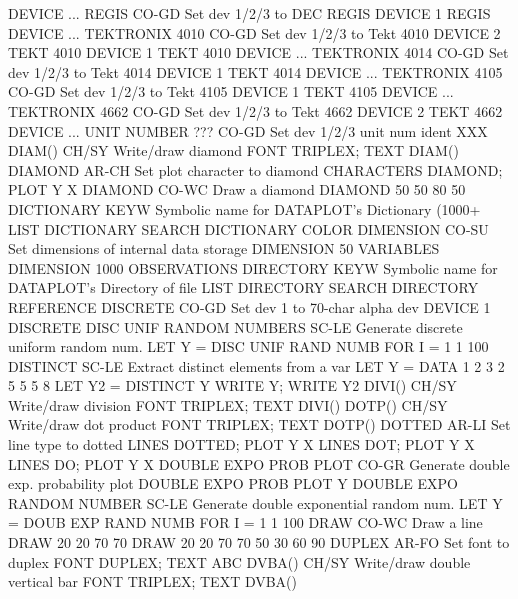 DEVICE ... REGIS            CO-GD Set dev 1/2/3 to DEC REGIS
                                  DEVICE 1 REGIS
DEVICE ... TEKTRONIX 4010   CO-GD Set dev 1/2/3 to Tekt 4010
                                  DEVICE 2 TEKT 4010
                                  DEVICE 1 TEKT 4010
DEVICE ... TEKTRONIX 4014   CO-GD Set dev 1/2/3 to Tekt 4014
                                  DEVICE 1 TEKT 4014
DEVICE ... TEKTRONIX 4105   CO-GD Set dev 1/2/3 to Tekt 4105
                                  DEVICE 1 TEKT 4105
DEVICE ... TEKTRONIX 4662   CO-GD Set dev 1/2/3 to Tekt 4662
                                  DEVICE 2 TEKT 4662
DEVICE ... UNIT NUMBER ???  CO-GD Set dev 1/2/3 unit num ident
                                  XXX
DIAM()                      CH/SY Write/draw diamond
                                  FONT TRIPLEX; TEXT DIAM()
DIAMOND                     AR-CH Set plot character to diamond
                                  CHARACTERS DIAMOND; PLOT Y X
DIAMOND                     CO-WC Draw a diamond
                                  DIAMOND 50 50 80 50
DICTIONARY                  KEYW  Symbolic name for DATAPLOT's Dictionary (1000+
                                  LIST DICTIONARY
                                  SEARCH DICTIONARY COLOR
DIMENSION                   CO-SU Set dimensions of internal data storage
                                  DIMENSION 50 VARIABLES
                                  DIMENSION 1000 OBSERVATIONS
DIRECTORY                   KEYW  Symbolic name for DATAPLOT's Directory of file
                                  LIST DIRECTORY
                                  SEARCH DIRECTORY REFERENCE
DISCRETE                    CO-GD Set dev 1 to  70-char alpha dev
                                  DEVICE 1 DISCRETE
DISC UNIF RANDOM NUMBERS    SC-LE Generate discrete uniform random num.
                                  LET Y = DISC UNIF RAND NUMB FOR I = 1 1 100
DISTINCT                    SC-LE Extract distinct elements from a var
                                  LET Y = DATA 1 2 3 2 5 5 5 8
                                  LET Y2 = DISTINCT Y
                                  WRITE Y; WRITE Y2
DIVI()                      CH/SY Write/draw division
                                  FONT TRIPLEX; TEXT DIVI()
DOTP()                      CH/SY Write/draw dot product
                                  FONT TRIPLEX; TEXT DOTP()
DOTTED                      AR-LI Set line type to dotted
                                  LINES DOTTED; PLOT Y X
                                  LINES DOT; PLOT Y X
                                  LINES DO; PLOT Y X
DOUBLE EXPO PROB PLOT       CO-GR Generate double exp. probability plot
                                  DOUBLE EXPO PROB PLOT Y
DOUBLE EXPO RANDOM NUMBER   SC-LE Generate double exponential random num.
                                  LET Y = DOUB EXP RAND NUMB FOR I = 1 1 100
DRAW                        CO-WC Draw a line
                                  DRAW 20 20 70 70
                                  DRAW 20 20 70 70 50 30 60 90
DUPLEX                      AR-FO Set font to duplex
                                  FONT DUPLEX; TEXT ABC
DVBA()                      CH/SY Write/draw double vertical bar
                                  FONT TRIPLEX; TEXT DVBA()
 
